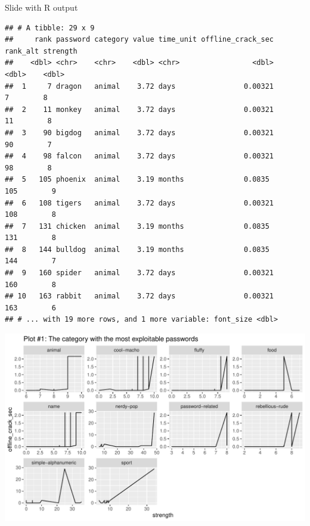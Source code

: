 \documentclass[10pt,ignorenonframetext,aspectratio=169]{beamer}
\newenvironment{Shaded}{\begin{snugshade}}{\end{snugshade}}
\newcommand{\AttributeTok}[1]{\textcolor[rgb]{0.77,0.63,0.00}{#1}}
\newcommand{\DecValTok}[1]{\textcolor[rgb]{0.00,0.00,0.81}{#1}}
\newcommand{\FunctionTok}[1]{\textcolor[rgb]{0.00,0.00,0.00}{#1}}
\newcommand{\NormalTok}[1]{#1}
\newcommand{\OtherTok}[1]{\textcolor[rgb]{0.56,0.35,0.01}{#1}}
\newcommand{\SpecialCharTok}[1]{\textcolor[rgb]{0.00,0.00,0.00}{#1}}
\newcommand{\StringTok}[1]{\textcolor[rgb]{0.31,0.60,0.02}{#1}}
\renewenvironment{Shaded}{\color{black}\begin{snugshade}\color{black}}{\end{snugshade}}
\begin{document}
\begin{frame}[fragile]{Slide with R output}
\begin{verbatim}
## # A tibble: 29 x 9
##     rank password category value time_unit offline_crack_sec rank_alt strength
##    <dbl> <chr>    <chr>    <dbl> <chr>                 <dbl>    <dbl>    <dbl>
##  1     7 dragon   animal    3.72 days                0.00321        7        8
##  2    11 monkey   animal    3.72 days                0.00321       11        8
##  3    90 bigdog   animal    3.72 days                0.00321       90        7
##  4    98 falcon   animal    3.72 days                0.00321       98        8
##  5   105 phoenix  animal    3.19 months              0.0835       105        9
##  6   108 tigers   animal    3.72 days                0.00321      108        8
##  7   131 chicken  animal    3.19 months              0.0835       131        8
##  8   144 bulldog  animal    3.19 months              0.0835       144        7
##  9   160 spider   animal    3.72 days                0.00321      160        8
## 10   163 rabbit   animal    3.72 days                0.00321      163        6
## # ... with 19 more rows, and 1 more variable: font_size <dbl>
\end{verbatim}

\begin{Shaded}
\end{Shaded}

\includegraphics{Untitled_files/figure-beamer/p1d-1.pdf}


\end{frame}
\end{document}
